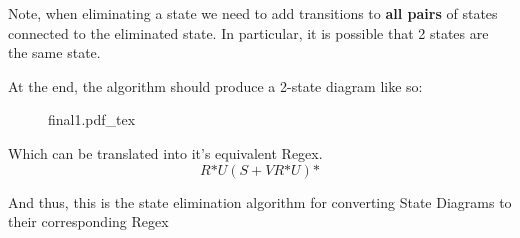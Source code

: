 \documentclass[12pt]{book}
\newcommand{\incfig}[1]{%
    {#1.pdf_tex}
}
\begin{document}
Note, when eliminating a state we need to add transitions to \textbf{all pairs} of states connected to the eliminated state.
In particular, it is possible that 2 states are the same state.\\
\pagebreak

At the end, the algorithm should produce a 2-state diagram like so:
\begin{figure}[h]
        \centering
        \incfig{final1}
\end{figure}

Which can be translated into it's equivalent Regex.
\[R\text{*}U(S+VR\text{*}U)\text{*}\]

And thus, this is the state elimination algorithm for converting State Diagrams to their corresponding Regex
\end{document}
